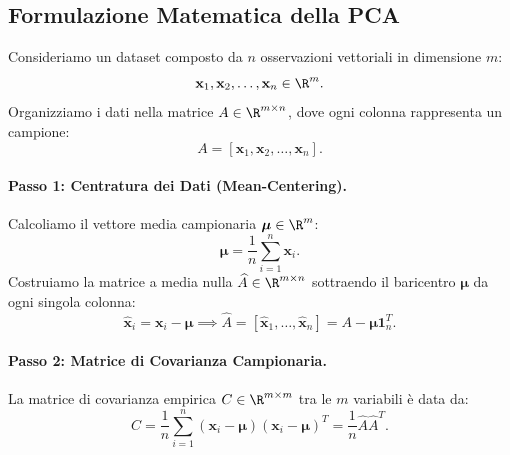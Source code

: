 \subsection{Formulazione Matematica della PCA}

Consideriamo un dataset composto da $n$ osservazioni vettoriali in dimensione $m$:
\begin{equation}
    \mathbf{x}_1, \mathbf{x}_2, \dots, \mathbf{x}_n \in \R^m.
\end{equation}
Organizziamo i dati nella matrice $A \in \R^{m \times n}$, dove ogni colonna rappresenta un campione:
\begin{equation}
    A = [\mathbf{x}_1, \mathbf{x}_2, \dots, \mathbf{x}_n].
\end{equation}

\paragraph{Passo 1: Centratura dei Dati (Mean-Centering).}
Calcoliamo il vettore media campionaria $\boldsymbol{\mu} \in \R^m$:
\begin{equation}
    \boldsymbol{\mu} = \frac{1}{n} \sum_{i=1}^n \mathbf{x}_i.
\end{equation}
Costruiamo la matrice a media nulla $\widehat{A} \in \R^{m \times n}$ sottraendo il baricentro $\boldsymbol{\mu}$ da ogni singola colonna:
\begin{equation}
    \widehat{\mathbf{x}}_i = \mathbf{x}_i - \boldsymbol{\mu} \implies \widehat{A} = [\widehat{\mathbf{x}}_1, \dots, \widehat{\mathbf{x}}_n] = A - \boldsymbol{\mu} \mathbf{1}_n^T.
\end{equation}

\paragraph{Passo 2: Matrice di Covarianza Campionaria.}
La matrice di covarianza empirica $C \in \R^{m \times m}$ tra le $m$ variabili \`e data da:
\begin{equation}
    C = \frac{1}{n} \sum_{i=1}^n (\mathbf{x}_i - \boldsymbol{\mu})(\mathbf{x}_i - \boldsymbol{\mu})^T = \frac{1}{n} \widehat{A} \widehat{A}^T.
\end{equation}

